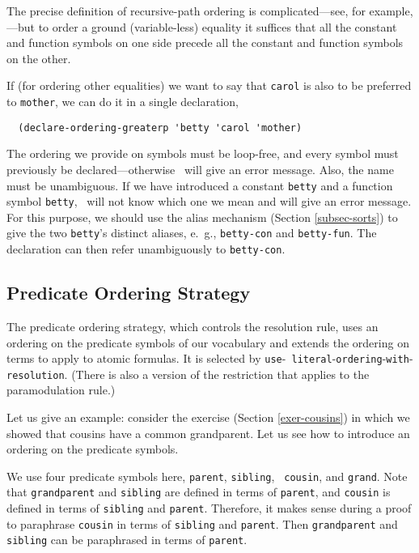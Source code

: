 The precise definition of recursive-path ordering is
complicated---see, for example, \cite{recursive-path}---but to order a
ground (variable-less) equality it suffices that all the constant and
function symbols on one side precede all the constant and function
symbols on the other.

If (for ordering other equalities) we want to say that
\verb'carol' is also to be preferred to \verb'mother', we can do it in
a single declaration,
\begin{verbatim}
  (declare-ordering-greaterp 'betty 'carol 'mother)
\end{verbatim}
The ordering we
provide on symbols must be loop-free, and every symbol must previously be
declared---otherwise \snark\  will give an error message.  Also, the name must
be unambiguous.  If we have introduced a constant {\tt betty} and a function
symbol {\tt betty}, \snark\  will not know which one we mean and will give an
error message.  For this purpose, we should use the alias mechanism (Section
\ref{subsec-sorts}) to give the two {\tt betty}'s distinct aliases, e.\  g.,
{\tt betty-con} and {\tt betty-fun}.  The declaration can then refer
unambiguously to {\tt betty-con}.

\subsection{Predicate Ordering Strategy}
\label{subsec-predicate-ordering}

The predicate ordering strategy, which controls the resolution rule, uses an
ordering on the predicate symbols of our vocabulary and extends the ordering
on terms to apply to atomic formulas.  It is selected by {\tt use}-{\tt
literal}-{\tt ordering}-{\tt with}-{\tt resolution}.  (There is also a
version of the restriction that applies to the paramodulation rule.)

Let us give an example: consider the exercise (Section
\ref{exer-cousins}) in which we showed that cousins have a common
grandparent.  Let us see how to introduce an ordering on the predicate
symbols.

We use four predicate symbols here, {\tt parent}, {\tt sibling}, {\tt
cousin}, and {\tt grand}.  Note that {\tt grandparent}
and {\tt sibling} are defined in terms of {\tt parent}, and {\tt cousin} is
defined in terms of {\tt sibling} and {\tt parent}.  Therefore, it makes
sense during a proof to paraphrase {\tt cousin} in terms of {\tt sibling} and
{\tt parent}.  Then {\tt grandparent} and {\tt sibling} can be paraphrased in
terms of {\tt parent}.


